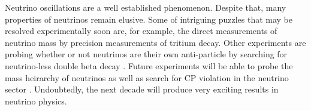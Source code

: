 Neutrino oscillations are a well established phenomenon.  Despite that, many properties of neutrinos remain elusive.  Some of intriguing puzzles that may be resolved experimentally soon are, for example, the direct measurements of neutrino mass \cite{BORNSCHEIN200514, Mertens:2014nha} by precision measurements of tritium decay.  Other experiments are probing whether or not neutrinos are their own anti-particle by searching for neutrino-less double beta decay \cite{Sisti:2015ayc, Auger:2012ar, 0954-3899-42-11-115201}.  Future experiments will be able to probe the mass heirarchy of neutrinos \cite{Abe:2011ts, Acciarri:2016ooe} as well as search for CP violation in the neutrino sector \cite{Acciarri:2016ooe, Ayres:2004js}.  Undoubtedly, the next decade will produce very exciting results in neutrino physics.


